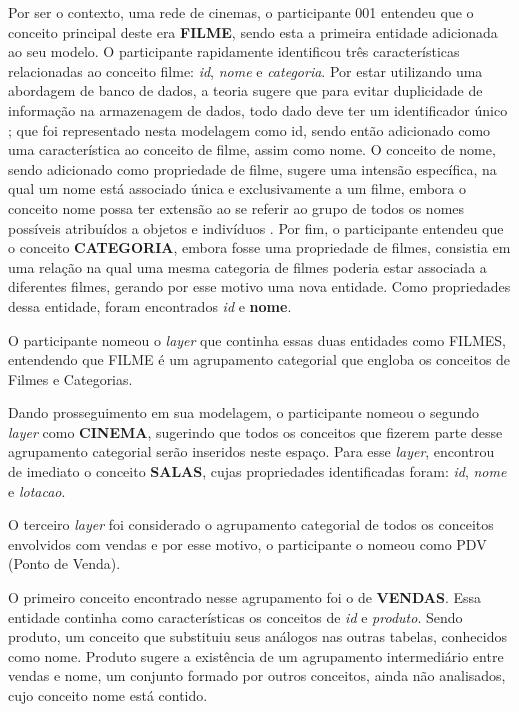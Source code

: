 Por ser o contexto, uma rede de cinemas, o participante 001 entendeu que o conceito principal deste era \textbf{FILME}, sendo esta a primeira entidade adicionada ao seu modelo. O participante rapidamente identificou três características relacionadas ao conceito filme: \textit{id}, \textit{nome} e \textit{categoria}. Por estar utilizando uma abordagem de banco de dados, a teoria sugere que para evitar duplicidade de informação na armazenagem de dados, todo dado deve ter um identificador único \cite{heuser:2001.projeto, machado:2009.projeto}; que foi representado nesta modelagem como id, sendo então adicionado como uma característica ao conceito de filme, assim como nome. O conceito de nome, sendo adicionado como propriedade de filme, sugere uma intensão específica, na qual um nome está associado única e exclusivamente a um filme, embora o conceito nome possa ter extensão ao se referir ao grupo de todos os nomes possíveis atribuídos a objetos e indivíduos \cite{dahlberg:1978.fundamentos}. Por fim, o participante entendeu que o conceito \textbf{CATEGORIA}, embora fosse uma propriedade de filmes, consistia em uma relação na qual uma mesma categoria de filmes poderia estar associada a diferentes filmes, gerando por esse motivo uma nova entidade. Como propriedades dessa entidade, foram encontrados \textit{id} e \textbf{nome}.

O participante nomeou o \textit{layer} que continha essas duas entidades como FILMES, entendendo que FILME é um agrupamento categorial que engloba os conceitos de Filmes e Categorias.
 
Dando prosseguimento em sua modelagem, o participante nomeou o segundo \textit{layer} como \textbf{CINEMA}, sugerindo que todos os conceitos que fizerem parte desse agrupamento categorial serão inseridos neste espaço. Para esse \textit{layer}, encontrou de imediato o conceito \textbf{SALAS}, cujas propriedades identificadas foram: \textit{id}, \textit{nome} e \textit{lotacao}.

O terceiro \textit{layer} foi considerado o agrupamento categorial de todos os conceitos envolvidos com vendas e por esse motivo, o participante o nomeou como PDV (Ponto de Venda). 

O primeiro conceito encontrado nesse agrupamento foi o de \textbf{VENDAS}. Essa entidade continha como características os conceitos de \textit{id} e \textit{produto}. Sendo produto, um conceito que substituiu seus análogos nas outras tabelas, conhecidos como nome. Produto sugere a existência de um agrupamento intermediário entre vendas e nome, um conjunto formado por outros conceitos, ainda não analisados, cujo conceito nome está contido.

